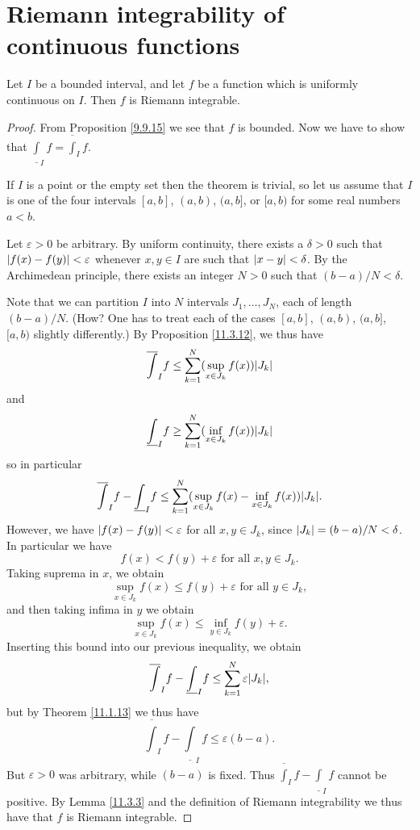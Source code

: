 \section{Riemann integrability of continuous functions}\label{sec 11.5}

\begin{theorem}\label{11.5.1}
    Let \(I\) be a bounded interval, and let \(f\) be a function which is uniformly continuous on \(I\).
    Then \(f\) is Riemann integrable.
\end{theorem}

\begin{proof}
    From Proposition \ref{9.9.15} we see that \(f\) is bounded.
    Now we have to show that \(\underline{\int}_I f = \overline{\int}_I f\).

    If \(I\) is a point or the empty set then the theorem is trivial, so let us assume that \(I\) is one of the four intervals \([a, b]\), \((a, b)\), \((a, b]\), or \([a, b)\) for some real numbers \(a < b\).

            Let \(\varepsilon > 0\) be arbitrary.
            By uniform continuity, there exists a \(\delta > 0\) such that \(\abs*{f(x) - f(y)} < \varepsilon\) whenever \(x, y \in I\) are such that \(\abs*{x - y} < \delta\).
            By the Archimedean principle, there exists an integer \(N > 0\) such that \((b - a) / N < \delta\).

            Note that we can partition \(I\) into \(N\) intervals \(J_1, \dots, J_N\), each of length \((b - a) / N\).
            (How? One has to treat each of the cases \([a, b]\), \((a, b)\), \((a, b]\), \([a, b)\) slightly differently.)
    By Proposition \ref{11.3.12}, we thus have
    \[
        \overline{\int}_I f \leq \sum_{k = 1}^N (\sup_{x \in J_k} f(x)) \abs*{J_k}
    \]
    and
    \[
        \underline{\int}_I f \geq \sum_{k = 1}^N (\inf_{x \in J_k} f(x)) \abs*{J_k}
    \]
    so in particular
    \[
        \overline{\int}_I f - \underline{\int}_I f \leq \sum_{k = 1}^N (\sup_{x \in J_k} f(x) - \inf_{x \in J_k} f(x)) \abs*{J_k}.
    \]
    However, we have \(\abs*{f(x) - f(y)} < \varepsilon\) for all \(x, y \in J_k\), since \(\abs*{J_k} = (b - a) / N < \delta\).
    In particular we have
    \[
        f(x) < f(y) + \varepsilon \text{ for all } x, y \in J_k.
    \]
    Taking suprema in \(x\), we obtain
    \[
        \sup_{x \in J_k} f(x) \leq f(y) + \varepsilon \text{ for all } y \in J_k,
    \]
    and then taking infima in \(y\) we obtain
    \[
        \sup_{x \in J_k} f(x) \leq \inf_{y \in J_k} f(y) + \varepsilon.
    \]
    Inserting this bound into our previous inequality, we obtain
    \[
        \overline{\int}_I f - \underline{\int}_I f \leq \sum_{k = 1}^N \varepsilon \abs*{J_k},
    \]
    but by Theorem \ref{11.1.13} we thus have
    \[
        \overline{\int}_I f - \underline{\int}_I f \leq \varepsilon (b - a).
    \]
    But \(\varepsilon > 0\) was arbitrary, while \((b - a)\) is fixed.
    Thus \(\overline{\int}_I f - \underline{\int}_I f\) cannot be positive.
    By Lemma \ref{11.3.3} and the definition of Riemann integrability we thus have that \(f\) is Riemann integrable.
\end{proof}

